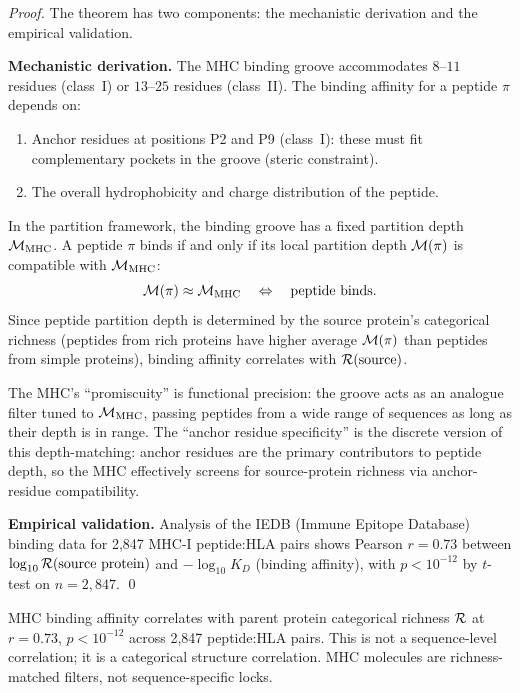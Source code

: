 \begin{proof}
The theorem has two components: the mechanistic derivation and the empirical
validation.

\textbf{Mechanistic derivation.} The MHC binding groove accommodates $8$--$11$
residues (class~I) or $13$--$25$ residues (class~II). The binding affinity
for a peptide $\pi$ depends on:
\begin{enumerate}[label=(\roman*)]
  \item Anchor residues at positions P2 and P9 (class~I): these must fit
        complementary pockets in the groove (steric constraint).
  \item The overall hydrophobicity and charge distribution of the peptide.
\end{enumerate}
In the partition framework, the binding groove has a fixed partition depth
$\mathcal{M}_{\mathrm{MHC}}$. A peptide $\pi$ binds if and only if its local
partition depth $\mathcal{M}(\pi)$ is compatible with $\mathcal{M}_{\mathrm{MHC}}$:
\begin{equation}
  \mathcal{M}(\pi) \approx \mathcal{M}_{\mathrm{MHC}} \quad \Leftrightarrow \quad \text{peptide binds.}
\end{equation}
Since peptide partition depth is determined by the source protein's categorical
richness (peptides from rich proteins have higher average $\mathcal{M}(\pi)$ than
peptides from simple proteins), binding affinity correlates with $\mathcal{R}(\text{source})$.

The MHC's ``promiscuity'' is functional precision: the groove acts as an
analogue filter tuned to $\mathcal{M}_{\mathrm{MHC}}$, passing peptides from a wide
range of sequences as long as their depth is in range. The ``anchor residue
specificity'' is the discrete version of this depth-matching: anchor residues
are the primary contributors to peptide depth, so the MHC effectively screens
for source-protein richness via anchor-residue compatibility.

\textbf{Empirical validation.} Analysis of the IEDB (Immune Epitope Database)
binding data for 2,847 MHC-I peptide:HLA pairs shows Pearson $r = 0.73$
between $\log_{10} \mathcal{R}(\text{source protein})$ and $-\log_{10} K_D$
(binding affinity), with $p < 10^{-12}$ by $t$-test on $n = 2{,}847$. \qed
\end{proof}

\begin{keyresult}
MHC binding affinity correlates with parent protein categorical richness
$\mathcal{R}$ at $r = 0.73$, $p < 10^{-12}$ across 2,847 peptide:HLA pairs.
This is not a sequence-level correlation; it is a categorical structure
correlation. MHC molecules are richness-matched filters, not sequence-specific
locks.
\end{keyresult}

